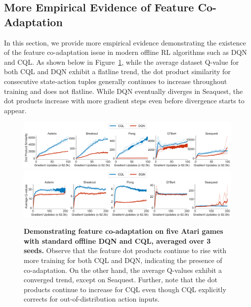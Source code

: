 \subsection{More Empirical Evidence of Feature Co-Adaptation}
\label{app:more_evidence_coadaptation}
In this section, we provide more empirical evidence demonstrating the existence of the feature co-adaptation issue in modern offline RL algorithms such as DQN and CQL. As shown below in Figure~\ref{fig:dot_product_increases_five_games}, while the average dataset Q-value for both CQL and DQN exhibit a flatline trend, the dot product similarity for consecutive state-action tuples generally continues to increase throughout training and does not flatline. While DQN eventually diverges in Seaquest, the dot products increase with more gradient steps even before divergence starts to appear.  
\begin{figure}[h]
    \centering
    \vspace{-0.1in}
    \includegraphics[width=0.99\textwidth]{figures_iclr/figure1_dotproduct_value.pdf}
    \includegraphics[width=0.99\textwidth]{figures_iclr/figure1_q_vals.pdf}
    \vspace{-5pt}
    \caption{\footnotesize{\label{fig:dot_product_increases_five_games} \textbf{Demonstrating feature co-adaptation on five Atari games with standard offline DQN and CQL, averaged over 3 seeds.} Observe that the feature dot products continue to rise with more training for both CQL and DQN, indicating the presence of co-adaptation. On the other hand, the average Q-values exhibit a converged trend, except on Seaquest. Further, note that the dot products continue to increase for CQL even though CQL explicitly corrects for out-of-distribution action inputs. }}
    \vspace{-0.1in}
\end{figure}

\vspace{-0.1in}

